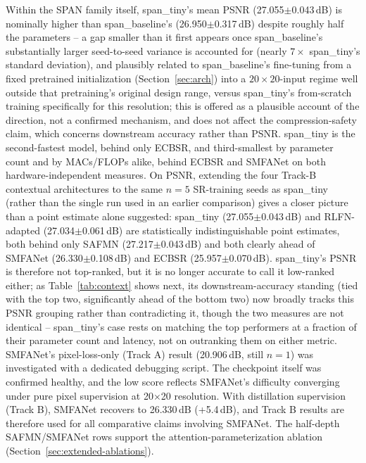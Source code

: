 \documentclass[11pt]{article}
\begin{document}
Within the SPAN family itself, span\_tiny's mean PSNR (27.055$\pm$0.043\,dB) is nominally higher than span\_baseline's (26.950$\pm$0.317\,dB) despite roughly half the parameters -- a gap smaller than it first appears once span\_baseline's substantially larger seed-to-seed variance is accounted for (nearly $7\times$ span\_tiny's standard deviation), and plausibly related to span\_baseline's fine-tuning from a fixed pretrained initialization (Section~\ref{sec:arch}) into a $20\times20$-input regime well outside that pretraining's original design range, versus span\_tiny's from-scratch training specifically for this resolution; this is offered as a plausible account of the direction, not a confirmed mechanism, and does not affect the compression-safety claim, which concerns downstream accuracy rather than PSNR. span\_tiny is the second-fastest model, behind only ECBSR, and third-smallest by parameter count and by MACs/FLOPs alike, behind ECBSR and SMFANet on both hardware-independent measures. On PSNR, extending the four Track-B contextual architectures to the same $n=5$ SR-training seeds as span\_tiny (rather than the single run used in an earlier comparison) gives a closer picture than a point estimate alone suggested: span\_tiny (27.055$\pm$0.043\,dB) and RLFN-adapted (27.034$\pm$0.061\,dB) are statistically indistinguishable point estimates, both behind only SAFMN (27.217$\pm$0.043\,dB) and both clearly ahead of SMFANet (26.330$\pm$0.108\,dB) and ECBSR (25.957$\pm$0.070\,dB). span\_tiny's PSNR is therefore not top-ranked, but it is no longer accurate to call it low-ranked either; as Table~\ref{tab:context} shows next, its downstream-accuracy standing (tied with the top two, significantly ahead of the bottom two) now broadly tracks this PSNR grouping rather than contradicting it, though the two measures are not identical -- span\_tiny's case rests on matching the top performers at a fraction of their parameter count and latency, not on outranking them on either metric. SMFANet's pixel-loss-only (Track A) result (20.906\,dB, still $n=1$) was investigated with a dedicated debugging script. The checkpoint itself was confirmed healthy, and the low score reflects SMFANet's difficulty converging under pure pixel supervision at 20$\times$20 resolution. With distillation supervision (Track B), SMFANet recovers to 26.330\,dB (+5.4\,dB), and Track B results are therefore used for all comparative claims involving SMFANet. The half-depth SAFMN/SMFANet rows support the attention-parameterization ablation (Section~\ref{sec:extended-ablations}).
\end{document}
